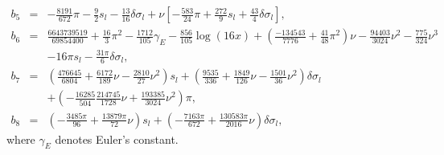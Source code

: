 \begin{widetext}
\begin{eqnarray}
b_{5} &=& -\frac{8191}{672}\pi - \frac{9}{2}s_{l} - \frac{13}{16}\delta\sigma_{l} + \nu\left[-\frac{583}{24}\pi + \frac{272}{9}s_{l} + \frac{43}{4}\delta\sigma_{l}\right],\\
b_{6} &=& \frac{6643739519}{69854400} + \frac{16}{3}\pi^{2} - \frac{1712}{105}\gamma_{E} - \frac{856}{105}\log(16x)+
 \left(\frac{-134543}{7776}+\frac{41}{48}\pi^{2}\right)\nu -
 \frac{94403}{3024}\nu^{2}-\frac{775}{324}\nu^{3} \nonumber\\
 && - 16\pi s_{l} - \frac{31\pi}{6}\delta\sigma_{l},\\
 b_{7}&=& \left(\frac{476645}{6804} + \frac{6172}{189}\nu -
   \frac{2810}{27}\nu^{2}\right)s_{l} +
 \left(\frac{9535}{336}+\frac{1849}{126}\nu -
   \frac{1501}{36}\nu^{2}\right)\delta\sigma_{l} \nonumber\\
&&+  \left(-\frac{16285}{504} \frac{214745}{1728}\nu +\frac{193385}{3024}\nu^{2}\right)\pi,\\
 b_{8} &=& \left(-\frac{3485\pi}{96} + \frac{13879\pi}{72}\nu\right)s_{l} + \left(-\frac{7163\pi}{672} + \frac{130583\pi}{2016}\nu\right)\delta\sigma_l,
\end{eqnarray}
where $\gamma_E$ denotes Euler's constant.


\end{widetext}
